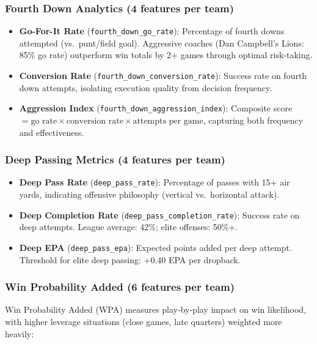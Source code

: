 \subsubsection{Fourth Down Analytics (4 features per team)}

\begin{itemize}
  \item \textbf{Go-For-It Rate} (\texttt{fourth\_down\_go\_rate}): Percentage of fourth downs attempted (vs.\ punt/field goal). Aggressive coaches (Dan Campbell's Lions: 85\% go rate) outperform win totals by 2+ games through optimal risk-taking.

  \item \textbf{Conversion Rate} (\texttt{fourth\_down\_conversion\_rate}): Success rate on fourth down attempts, isolating execution quality from decision frequency.

  \item \textbf{Aggression Index} (\texttt{fourth\_down\_aggression\_index}): Composite score $= \text{go rate} \times \text{conversion rate} \times \text{attempts per game}$, capturing both frequency and effectiveness.
\end{itemize}

\subsubsection{Deep Passing Metrics (4 features per team)}

\begin{itemize}
  \item \textbf{Deep Pass Rate} (\texttt{deep\_pass\_rate}): Percentage of passes with 15+ air yards, indicating offensive philosophy (vertical vs.\ horizontal attack).

  \item \textbf{Deep Completion Rate} (\texttt{deep\_pass\_completion\_rate}): Success rate on deep attempts. League average: 42\%; elite offenses: 50\%+.

  \item \textbf{Deep EPA} (\texttt{deep\_pass\_epa}): Expected points added per deep attempt. Threshold for elite deep passing: +0.40 EPA per dropback.
\end{itemize}

\subsubsection{Win Probability Added (6 features per team)}

Win Probability Added (WPA) measures play-by-play impact on win likelihood, with higher leverage situations (close games, late quarters) weighted more heavily:


